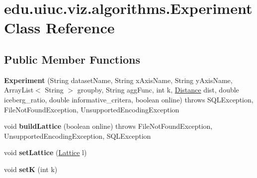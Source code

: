 \hypertarget{classedu_1_1uiuc_1_1viz_1_1algorithms_1_1_experiment}{}\section{edu.\+uiuc.\+viz.\+algorithms.\+Experiment Class Reference}
\label{classedu_1_1uiuc_1_1viz_1_1algorithms_1_1_experiment}
\subsection*{Public Member Functions}
\begin{DoxyCompactItemize}
\item 
\mbox{\label{classedu_1_1uiuc_1_1viz_1_1algorithms_1_1_experiment_a6e1595f762646d6ae4576f8dd8825120}} 
{\bfseries Experiment} (String dataset\+Name, String x\+Axis\+Name, String y\+Axis\+Name, Array\+List$<$ String $>$ groupby, String agg\+Func, int k, \mbox{\hyperlink{interfaceedu_1_1uiuc_1_1viz_1_1distance_1_1_distance}{Distance}} dist, double iceberg\+\_\+ratio, double informative\+\_\+critera, boolean online)  throws S\+Q\+L\+Exception, File\+Not\+Found\+Exception, Unsupported\+Encoding\+Exception 
\item 
\mbox{\label{classedu_1_1uiuc_1_1viz_1_1algorithms_1_1_experiment_a15fe657fc7616ca90b068fc0255acc92}} 
void {\bfseries build\+Lattice} (boolean online)  throws File\+Not\+Found\+Exception, Unsupported\+Encoding\+Exception, S\+Q\+L\+Exception 
\item 
\mbox{\label{classedu_1_1uiuc_1_1viz_1_1algorithms_1_1_experiment_ac3c308465ae6adc732e42fb5cb3281b9}} 
void {\bfseries set\+Lattice} (\mbox{\hyperlink{classedu_1_1uiuc_1_1viz_1_1lattice_1_1_lattice}{Lattice}} l)
\item 
\mbox{\label{classedu_1_1uiuc_1_1viz_1_1algorithms_1_1_experiment_af16eb03743927a854fc45d62632dba5b}} 
void {\bfseries setK} (int k)
\item 
\mbox{\label{classedu_1_1uiuc_1_1viz_1_1algorithms_1_1_experiment_ae982382f4efbb8fe0e0ff13c42b229c5}} 

\end{DoxyCompactItemize}
